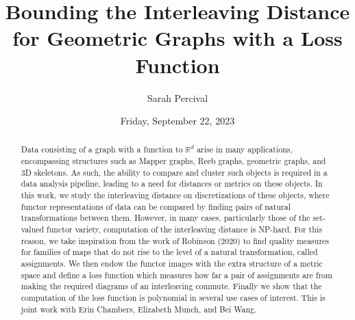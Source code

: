 \documentclass{UAmathtalk}
\author{Sarah Percival}
\title{Bounding the Interleaving Distance for Geometric Graphs with a Loss Function}
\date{Friday, September 22, 2023}
\begin{document}
\maketitle

\begin{abstract}
Data consisting of a graph with a function to $\mathbb{R}^d$ arise in many applications, encompassing structures such as Mapper graphs, Reeb graphs, geometric graphs, and 3D skeletons. 
As such, the ability to compare and cluster such objects is required in a data analysis pipeline, leading to a need for distances or metrics on these objects.  
In this work, we study the interleaving distance on discretizations of these objects, where functor representations of data can be compared by finding pairs of natural transformations between them. 
However, in many cases, particularly those of the set-valued functor variety, computation of the interleaving distance is NP-hard. 
For this reason, we take inspiration from the work of Robinson (2020) to find quality measures for families of maps that do not rise to the level of a natural transformation, called assignments. 
We then endow the functor images with the extra structure of a metric space and define a loss function which measures how far a pair of assignments are from making the required diagrams of an interleaving commute. 
Finally we show that the computation of the loss function is polynomial in several use cases of interest. 
This is joint work with Erin Chambers, Elizabeth Munch, and Bei Wang.
\end{abstract}
\end{document}
